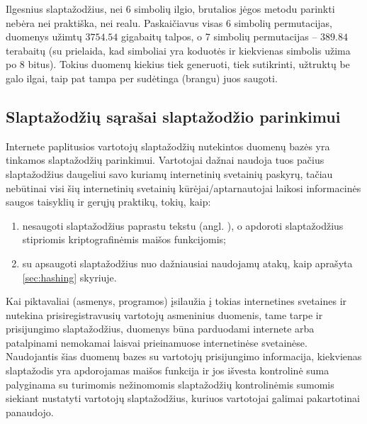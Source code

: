 \documentclass{VUMIFInfBakalaurinis}
\begin{document}
Ilgesnius slaptažodžius, nei 6 simbolių ilgio, brutalios jėgos metodu parinkti 
nebėra nei praktiška, nei realu. Paskaičiavus visas 6 simbolių permutacijas, 
duomenys užimtų $3754.54$ gigabaitų talpos, o 7 simbolių permutacijas -- 
$389.84$ terabaitų (su prielaida, kad simboliai yra  koduotės 
ir kiekvienas simbolis užima po 8 bitus). Tokius duomenų kiekius tiek generuoti, 
tiek sutikrinti, užtruktų be galo ilgai, taip pat tampa per sudėtinga (brangu) 
juos saugoti.

\subsection{Slaptažodžių sąrašai slaptažodžio parinkimui} \label{sec:wordlists}
Internete paplitusios vartotojų slaptažodžių nutekintos duomenų bazės yra 
tinkamos slaptažodžių parinkimui. Vartotojai dažnai naudoja tuos pačius 
slaptažodžius daugeliui savo kuriamų internetinių svetainių paskyrų, tačiau 
nebūtinai visi šių internetinių svetainių kūrėjai/aptarnautojai laikosi
informacinės saugos taisyklių ir gerųjų praktikų, tokių, kaip:
\begin{enumerate}
  \item nesaugoti slaptažodžius paprastu tekstu (angl. ), 
        o apdoroti slaptažodžius stipriomis kriptografinėmis maišos funkcijomis;
  \item su  apsaugoti slaptažodžius nuo dažniausiai naudojamų 
        atakų, kaip aprašyta \ref{sec:hashing} skyriuje.
\end{enumerate}

Kai piktavaliai (asmenys, programos) įsilaužia į tokias internetines svetaines 
ir nutekina prisiregistravusių vartotojų asmeninius duomenis, tame tarpe ir 
prisijungimo slaptažodžius, duomenys būna parduodami internete arba patalpinami 
nemokamai laisvai prieinamuose internetinėse svetainėse. Naudojantis šias 
duomenų bazes su vartotojų prisijungimo informacija, kiekvienas slaptažodis yra 
apdorojamas maišos funkcija ir jos išvesta kontrolinė suma palyginama su 
turimomis nežinomomis slaptažodžių kontrolinėmis sumomis siekiant nustatyti 
vartotojų slaptažodžius, kuriuos vartotojai galimai pakartotinai panaudojo.
\end{document}
